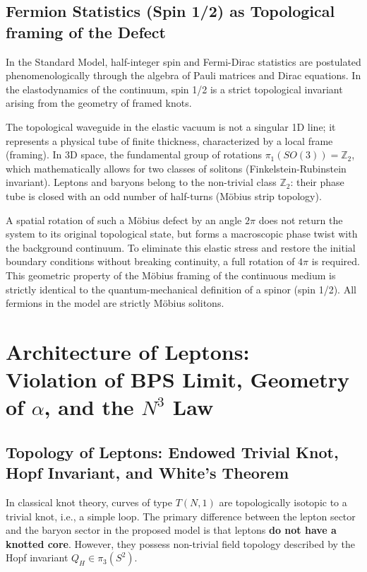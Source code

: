 \documentclass[11pt,a4paper]{article}
\begin{document}
\subsection{Fermion Statistics (Spin 1/2) as Topological \\ framing of the Defect}

	In the Standard Model, half-integer spin and Fermi-Dirac statistics are postulated phenomenologically through the algebra of Pauli matrices and Dirac equations. In the elastodynamics of the continuum, spin 1/2 is a strict topological invariant arising from the geometry of framed knots.

The topological waveguide in the elastic vacuum is not a singular 1D line; it represents a physical tube of finite thickness, characterized by a local frame (framing). In 3D space, the fundamental group of rotations $\pi_1(SO(3)) = \mathbb{Z}_2$, which mathematically allows for two classes of solitons (Finkelstein-Rubinstein invariant).
Leptons and baryons belong to the non-trivial class $\mathbb{Z}_2$: their phase tube is closed with an odd number of half-turns (Möbius strip topology). 

A spatial rotation of such a Möbius defect by an angle $2\pi$ does not return the system to its original topological state, but forms a macroscopic phase twist with the background continuum. To eliminate this elastic stress and restore the initial boundary conditions without breaking continuity, a full rotation of $4\pi$ is required. This geometric property of the Möbius framing of the continuous medium is strictly identical to the quantum-mechanical definition of a spinor (spin 1/2). All fermions in the model are strictly Möbius solitons.
\section{Architecture of Leptons:\\ Violation of BPS Limit, Geometry of $\alpha$, and the $N^3$ Law}
	
\subsection{Topology of Leptons: Endowed Trivial Knot,\\ Hopf Invariant, and White's Theorem}
	In classical knot theory, curves of type $T(N,1)$ are topologically isotopic to a trivial knot, i.e., a simple loop. The primary difference between the lepton sector and the baryon sector in the proposed model is that leptons \textbf{do not have a knotted core}. However, they possess non-trivial field topology described by the Hopf invariant $Q_H \in \pi_3(S^2)$.
	
\end{document}
